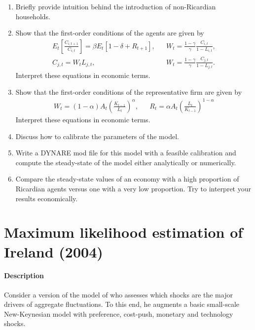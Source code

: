 \documentclass{article}
\begin{document}
\begin{enumerate}
	\item Briefly provide intuition behind the introduction of non-Ricardian households.
	\item Show that the first-order conditions of the agents are given by
		\begin{align*}
		E_t\left[\frac{C_{i,t+1}}{C_{i,t}}\right] = \beta E_t\left[1-\delta + R_{t+1}\right],&&		
		W_t = \frac{1-\gamma}{\gamma} \frac{C_{i,t}}{1-L_{i,t}},\\
		C_{j,t} = W_t L_{j,t}, &&
		W_t = \frac{1-\gamma}{\gamma} \frac{C_{j,t}}{1-L_{j,t}}.
		\end{align*}
	Interpret these equations in economic terms.
	
	\item Show that the first-order conditions of the representative firm are given by
	\begin{align*}
	W_t = (1-\alpha) A_t \left(\frac{K_{t-1}}{L_t}\right)^\alpha, &&	R_t = \alpha A_t \left(\frac{L_t}{K_{t-1}}\right)^{1-\alpha}
	\end{align*}
	Interpret these equations in economic terms.
	\item Discuss how to calibrate the parameters of the model.
	\item Write a DYNARE mod file for this model with a feasible calibration and compute the steady-state of the model either analytically or numerically.
	\item Compare the steady-state values of an economy with a high proportion of Ricardian agents versus one with a very low proportion.
	Try to interpret your results economically.
\end{enumerate} 

\newpage

\section[Maximum likelihood estimation of Ireland (2004)]{Maximum likelihood estimation of Ireland (2004)\label{ex:Ireland2004ML}}
\paragraph{Description}
Consider a version of the model of \textcite{Ireland_2004_TechnologyShocksNew} who assesses which shocks are the major drivers of aggregate fluctuations.
To this end, he augments a basic small-scale New-Keynesian model with preference, cost-push, monetary and technology shocks.
\end{document}
